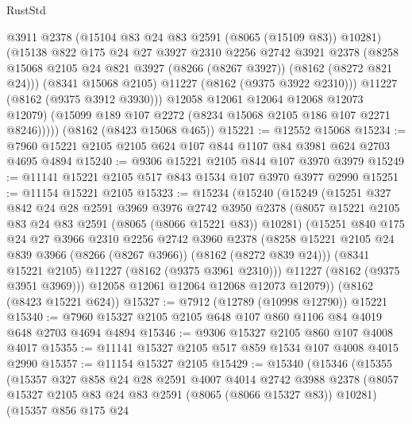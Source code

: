 \begin{lexlean}{RustStd}
\begin{coremodule}
              @3911
              @2378
              (@15104 @83 @24 @83 @2591 (@8065 (@15109 @83)) @10281)
              (@15138
                @822
                @175
                @24
                @27
                @3927
                @2310
                @2256
                @2742
                @3921
                @2378
                (@8258 @15068 @2105 @24 @821 @3927 (@8266 (@8267 @3927)) (@8162 (@8272 @821 @24)))
                (@8341 @15068 @2105)
                @11227
                (@8162 (@9375 @3922 @2310)))
              @11227
              (@8162 (@9375 @3912 @3930)))
            @12058
            @12061
            @12064
            @12068
            @12073
            @12079)
          (@15099 @189 @107 @2272 (@8234 @15068 @2105 @186 @107 @2271 @8246)))))
    (@8162 (@8423 @15068 @465))
@15221 := @12552 @15068
@15234 := @7960 @15221 @2105 @2105 @624 @107 @844 @1107 @84 @3981 @624 @2703 @4695 @4894
@15240 := @9306 @15221 @2105 @844 @107 @3970 @3979
@15249 := @11141 @15221 @2105 @517 @843 @1534 @107 @3970 @3977 @2990
@15251 := @11154 @15221 @2105
@15323 := @15234
    (@15240
      (@15249
        (@15251
          @327
          @842
          @24
          @28
          @2591
          @3969
          @3976
          @2742
          @3950
          @2378
          (@8057 @15221 @2105 @83 @24 @83 @2591 (@8065 (@8066 @15221 @83)) @10281)
          (@15251
            @840
            @175
            @24
            @27
            @3966
            @2310
            @2256
            @2742
            @3960
            @2378
            (@8258 @15221 @2105 @24 @839 @3966 (@8266 (@8267 @3966)) (@8162 (@8272 @839 @24)))
            (@8341 @15221 @2105)
            @11227
            (@8162 (@9375 @3961 @2310)))
          @11227
          (@8162 (@9375 @3951 @3969)))
        @12058
        @12061
        @12064
        @12068
        @12073
        @12079))
    (@8162 (@8423 @15221 @624))
@15327 := @7912 (@12789 (@10998 @12790)) @15221
@15340 := @7960 @15327 @2105 @2105 @648 @107 @860 @1106 @84 @4019 @648 @2703 @4694 @4894
@15346 := @9306 @15327 @2105 @860 @107 @4008 @4017
@15355 := @11141 @15327 @2105 @517 @859 @1534 @107 @4008 @4015 @2990
@15357 := @11154 @15327 @2105
@15429 := @15340
    (@15346
      (@15355
        (@15357
          @327
          @858
          @24
          @28
          @2591
          @4007
          @4014
          @2742
          @3988
          @2378
          (@8057 @15327 @2105 @83 @24 @83 @2591 (@8065 (@8066 @15327 @83)) @10281)
          (@15357
            @856
            @175
            @24

\end{coremodule}
\end{lexlean}
